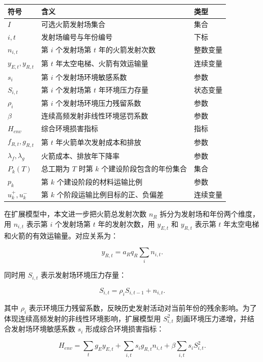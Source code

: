 \documentclass[12pt,a4paper,UTF8]{article}
\begin{document}
\begin{center}
\footnotesize
\renewcommand{\arraystretch}{1.22}
\begin{tabular}{p{}p{}p{}}
\toprule
符号 & 含义 & 类型 \\
\midrule
\(I\) & 可选火箭发射场集合 & 集合 \\
\(i,t\) & 发射场编号与年份编号 & 下标 \\
\(n_{i,t}\) & 第 \(i\) 个发射场第 \(t\) 年的火箭发射次数 & 整数变量 \\
\(y_{E,t},y_{R,t}\) & 第 \(t\) 年太空电梯、火箭有效运输量 & 连续变量 \\
\(s_i\) & 第 \(i\) 个发射场环境敏感系数 & 参数 \\
\(S_{i,t}\) & 第 \(i\) 个发射场第 \(t\) 年环境压力存量 & 状态变量 \\
\(\rho_i\) & 第 \(i\) 个发射场环境压力残留系数 & 参数 \\
\(\beta\) & 连续高频发射非线性环境惩罚系数 & 参数 \\
\(H_{env}\) & 综合环境损害指标 & 指标 \\
\(f_{R,t},g_{R,t}\) & 第 \(t\) 年火箭单次发射成本和排放 & 参数 \\
\(\lambda_f,\lambda_g\) & 火箭成本、排放年下降率 & 参数 \\
\(P_k(T)\) & 总工期为 \(T\) 时第 \(k\) 个建设阶段包含的年份集合 & 集合 \\
\(p_k\) & 第 \(k\) 个建设阶段的材料运输比例 & 参数 \\
\(u_k^+,u_k^-\) & 第 \(k\) 个阶段运输比例目标的正、负偏差 & 连续变量 \\
\bottomrule
\end{tabular}
\end{center}

在扩展模型中，本文进一步把火箭总发射次数 \(n_R\) 拆分为发射场和年份两个维度，用 \(n_{i,t}\) 表示第 \(i\) 个发射场第 \(t\) 年的发射次数，用 \(y_{E,t}\) 和 \(y_{R,t}\) 表示第 \(t\) 年太空电梯和火箭的有效运输量。对应关系为：

\[
y_{R,t}=a_Rq_R\sum_i n_{i,t}.
\]

同时用 \(S_{i,t}\) 表示发射场环境压力存量：

\[
S_{i,t}=\rho_iS_{i,t-1}+n_{i,t}.
\]

其中 \(\rho_i\) 表示环境压力残留系数，反映历史发射活动对当前年份的残余影响。为了体现连续高频发射的非线性环境影响，扩展模型用 \(S_{i,t}^2\) 刻画环境压力递增，并结合发射场环境敏感系数 \(s_i\) 形成综合环境损害指标：

\[
H_{env}=\sum_t g_Ey_{E,t}+\sum_{i,t}s_i g_{R,t}n_{i,t}+\beta\sum_{i,t}s_iS_{i,t}^2.
\]
\end{document}
